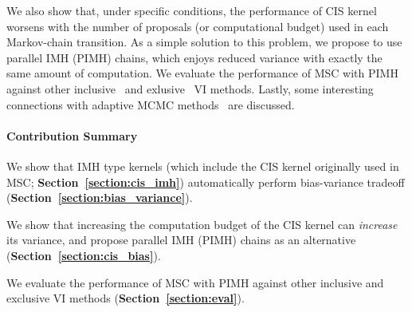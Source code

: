 We also show that, under specific conditions, the performance of CIS kernel worsens with the number of proposals (or computational budget) used in each Markov-chain transition.
As a simple solution to this problem, we propose to use parallel IMH (PIMH) chains, which enjoys reduced variance with exactly the same amount of computation.
We evaluate the performance of MSC with PIMH against other inclusive~\cite{DBLP:journals/corr/BornscheinB14, NEURIPS2020_b2070693} and exlusive~\cite{pmlr-v33-ranganath14, JMLR:v18:16-107} VI methods.
Lastly, some interesting connections with adaptive MCMC methods~\citep{10.1007/s11222-008-9110-y} are discussed.

\paragraph{Contribution Summary}
\begin{enumerate*}[label=\textbf{(\roman*)}]
\item We show that IMH type kernels (which include the CIS kernel originally used in MSC; \textbf{Section~\ref{section:cis_imh}}) automatically perform bias-variance tradeoff (\textbf{Section~\ref{section:bias_variance}}).
\item We show that increasing the computation budget of the CIS kernel can \textit{increase} its variance, and propose parallel IMH (PIMH) chains as an alternative (\textbf{Section~\ref{section:cis_bias}}).
\item We evaluate the performance of MSC with PIMH against other inclusive and exclusive VI methods (\textbf{Section~\ref{section:eval}}).
\end{enumerate*}




